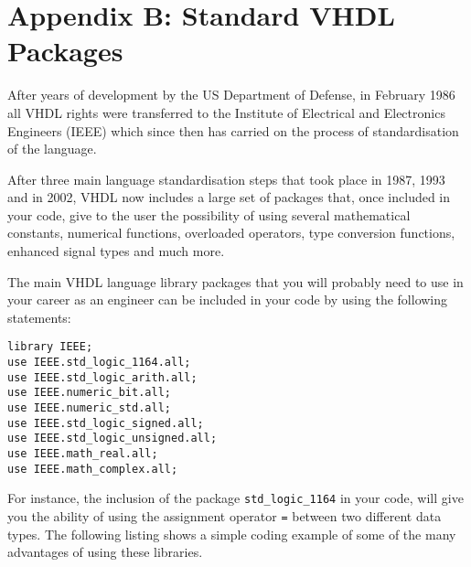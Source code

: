 \null\newpage
\thispagestyle{empty}
\mbox{}

\chapter{Appendix B: Standard VHDL Packages}
After years of development by the US Department of Defense, in February 1986 all VHDL rights were transferred to the Institute of Electrical and Electronics Engineers (IEEE) which since then has carried on the process of standardisation of the language. 

After three main language standardisation steps that took place in 1987, 1993 and in 2002, VHDL now includes a large set of packages that, once included in your code, give to the user the possibility of using several mathematical constants, numerical functions, overloaded operators, type conversion functions, enhanced signal types and much more.

The main VHDL language library packages that you will probably need to use in your career as an engineer can be included in your code by using the following statements:

\begin{verbatim}
library IEEE;
use IEEE.std_logic_1164.all;
use IEEE.std_logic_arith.all;
use IEEE.numeric_bit.all;
use IEEE.numeric_std.all;
use IEEE.std_logic_signed.all;
use IEEE.std_logic_unsigned.all;
use IEEE.math_real.all;
use IEEE.math_complex.all;
\end{verbatim}

For instance, the inclusion of the package \texttt{std\_logic\_1164} in your code, will give you the ability of using the assignment operator \texttt{=} between two different data types. The following listing shows a simple coding example of some of the many advantages of using these libraries.
\newpage
\clearpage

